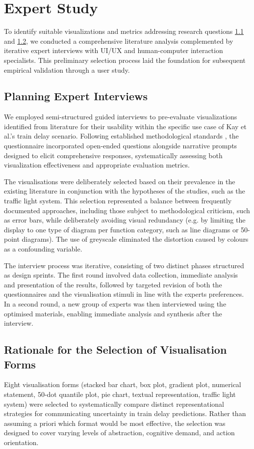 \documentclass[final,journal,a4paper]{IEEEtran}
\begin{document}
\section{Expert Study} \label{Expert Study}
To identify suitable visualizations and metrics addressing research questions \hyperlink{rq:1.1}{1.1} and \hyperlink{rq:1.1}{1.2}, we conducted a comprehensive literature analysis complemented by iterative expert interviews with UI/UX and human-computer interaction specialists. This preliminary selection process laid the foundation for subsequent empirical validation through a user study.

\subsection{Planning Expert Interviews}
We employed semi-structured guided interviews to pre-evaluate visualizations identified from literature for their usability within the specific use case of Kay et al.'s \cite{Kay2016} train delay scenario. Following established methodological standards \cite{Blasius2019, Kleemann2013}, the questionnaire incorporated open-ended questions alongside narrative prompts designed to elicit comprehensive responses, systematically assessing both visualization effectiveness and appropriate evaluation metrics.

The visualisations were deliberately selected based on their prevalence in the existing literature in conjunction with the hypotheses of the studies, such as the traffic light system. This selection represented a balance between frequently documented approaches, including those subject to methodological criticism, such as error bars, while deliberately avoiding visual redundancy (e.g. by limiting the display to one type of diagram per function category, such as line diagrams or 50-point diagrams). The use of greyscale eliminated the distortion caused by colours as a confounding variable.

The interview process was iterative, consisting of two distinct phases structured as design sprints. The first round involved data collection, immediate analysis and presentation of the results, followed by targeted revision of both the questionnaires and the visualisation stimuli in line with the experts preferences. In a second round, a new group of experts was then interviewed using the optimised materials, enabling immediate analysis and synthesis after the interview.

\subsection{Rationale for the Selection of Visualisation Forms}
Eight visualisation forms (stacked bar chart, box plot, gradient plot, numerical statement, 50-dot quantile plot, pie chart, textual representation, traffic light system) were selected to systematically compare distinct representational strategies for communicating uncertainty in train delay predictions. Rather than assuming a priori which format would be most effective, the selection was designed to cover varying levels of abstraction, cognitive demand, and action orientation.
\end{document}
